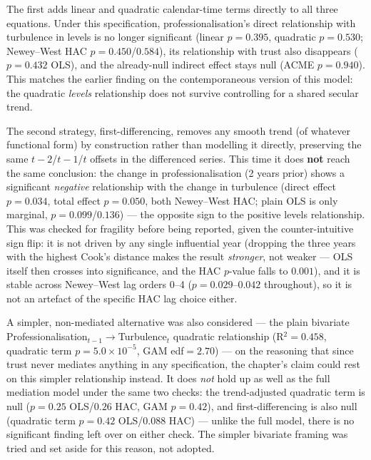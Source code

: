 The first adds linear and quadratic calendar-time terms directly to all three equations. Under
this specification, professionalisation's direct relationship with turbulence in levels is no
longer significant (linear $p=0.395$, quadratic $p=0.530$; Newey--West HAC $p=0.450$/$0.584$), its
relationship with trust also disappears ($p=0.432$ OLS), and the already-null indirect effect
stays null (ACME $p=0.940$). This matches the earlier finding on the contemporaneous version of
this model: the quadratic \emph{levels} relationship does not survive controlling for a shared
secular trend.

The second strategy, first-differencing, removes any smooth trend (of whatever functional form)
by construction rather than modelling it directly, preserving the same $t-2$/$t-1$/$t$ offsets in
the differenced series. This time it does \textbf{not} reach the same conclusion: the change in
professionalisation (2 years prior) shows a significant \emph{negative} relationship with the
change in turbulence (direct effect $p=0.034$, total effect $p=0.050$, both Newey--West HAC; plain
OLS is only marginal, $p=0.099$/$0.136$) --- the opposite sign to the positive levels relationship.
This was checked for fragility before being reported, given the counter-intuitive sign flip: it is
not driven by any single influential year (dropping the three years with the highest Cook's
distance makes the result \emph{stronger}, not weaker --- OLS itself then crosses into
significance, and the HAC $p$-value falls to $0.001$), and it is stable across Newey--West lag
orders 0--4 ($p=0.029$--$0.042$ throughout), so it is not an artefact of the specific HAC lag
choice either.

A simpler, non-mediated alternative was also considered --- the plain bivariate
Professionalisation$_{t-1}\to$Turbulence$_t$ quadratic relationship (R$^2=0.458$, quadratic term
$p=5.0\times10^{-5}$, GAM edf$=2.70$) --- on the reasoning that since trust never mediates
anything in any specification, the chapter's claim could rest on this simpler relationship
instead. It does \emph{not} hold up as well as the full mediation model under the same two
checks: the trend-adjusted quadratic term is null ($p=0.25$ OLS/$0.26$ HAC, GAM $p=0.42$), and
first-differencing is also null (quadratic term $p=0.42$ OLS/$0.088$ HAC) --- unlike the full
model, there is no significant finding left over on either check. The simpler bivariate framing
was tried and set aside for this reason, not adopted.


